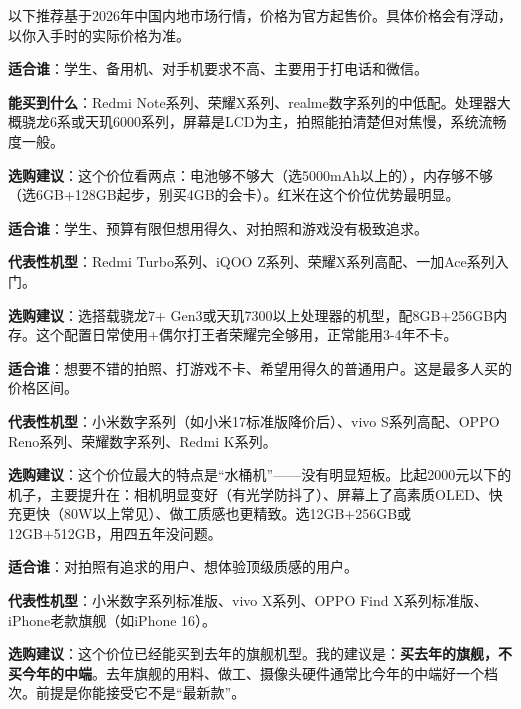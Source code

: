 
以下推荐基于2026年中国内地市场行情，价格为官方起售价。具体价格会有浮动，以你入手时的实际价格为准。


\textbf{适合谁}：学生、备用机、对手机要求不高、主要用于打电话和微信。

\textbf{能买到什么}：Redmi Note系列、荣耀X系列、realme数字系列的中低配。处理器大概骁龙6系或天玑6000系列，屏幕是LCD为主，拍照能拍清楚但对焦慢，系统流畅度一般。

\textbf{选购建议}：这个价位看两点：电池够不够大（选5000mAh以上的），内存够不够（选6GB+128GB起步，别买4GB的会卡）。红米在这个价位优势最明显。


\textbf{适合谁}：学生、预算有限但想用得久、对拍照和游戏没有极致追求。

\textbf{代表性机型}：Redmi Turbo系列、iQOO Z系列、荣耀X系列高配、一加Ace系列入门。

\textbf{选购建议}：选搭载骁龙7+ Gen3或天玑7300以上处理器的机型，配8GB+256GB内存。这个配置日常使用+偶尔打王者荣耀完全够用，正常能用3-4年不卡。


\textbf{适合谁}：想要不错的拍照、打游戏不卡、希望用得久的普通用户。这是最多人买的价格区间。

\textbf{代表性机型}：小米数字系列（如小米17标准版降价后）、vivo S系列高配、OPPO Reno系列、荣耀数字系列、Redmi K系列。

\textbf{选购建议}：这个价位最大的特点是“水桶机”——没有明显短板。比起2000元以下的机子，主要提升在：相机明显变好（有光学防抖了）、屏幕上了高素质OLED、快充更快（80W以上常见）、做工质感也更精致。选12GB+256GB或12GB+512GB，用四五年没问题。


\textbf{适合谁}：对拍照有追求的用户、想体验顶级质感的用户。

\textbf{代表性机型}：小米数字系列标准版、vivo X系列、OPPO Find X系列标准版、iPhone老款旗舰（如iPhone 16）。

\textbf{选购建议}：这个价位已经能买到去年的旗舰机型。我的建议是：\textbf{买去年的旗舰，不买今年的中端}。去年旗舰的用料、做工、摄像头硬件通常比今年的中端好一个档次。前提是你能接受它不是“最新款”。

